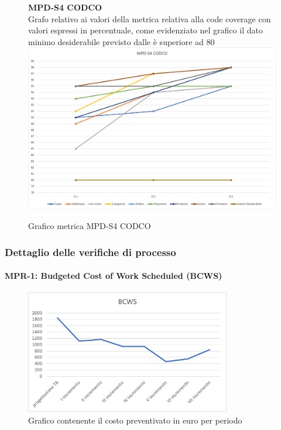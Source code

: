 \begin{center}
\begin{center}
    \end{center}




    \begin{figure}[!htb]
        \centering
        \textbf{MPD-S4 CODCO} \\
        Grafo relativo ai valori della metrica relativa alla code coverage con valori espressi in percentuale, come evidenziato nel 
        grafico il dato minimo desiderabile previsto dalle  è superiore ad 80
        \includegraphics[scale=0.60]{res/images/RQcodco.png}
        \caption{Grafico metrica MPD-S4 CODCO}
    \end{figure}
    \begin{center}
        
    \end{center}


\end{center}




\subsubsection{Dettaglio delle verifiche di processo}

\paragraph{MPR-1: Budgeted Cost of Work Scheduled (BCWS)}\label{_BCWS}
\begin{figure}[!htb]
    \centering
    \includegraphics[width=0.8\textwidth]{res/images/metriche_costi/BCWS.png}
    \caption{Grafico contenente il costo preventivato in euro per periodo}
\end{figure}

